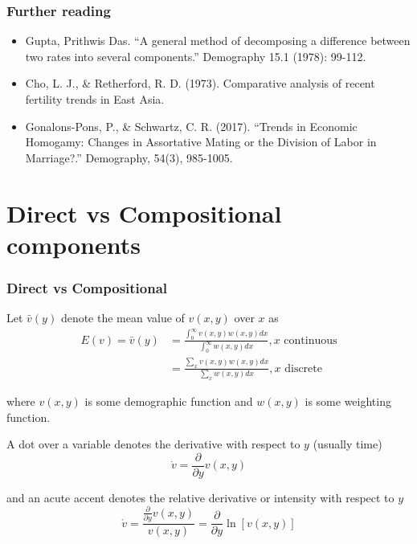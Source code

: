 \documentclass[xcolor={dvipsnames}]{beamer}
\begin{document}
\begin{frame}\frametitle{Further reading}
\begin{itemize}
\item Gupta, Prithwis Das. ``A general method of decomposing a difference between two rates into several components.'' Demography 15.1 (1978): 99-112.
\item Cho, L. J., \& Retherford, R. D. (1973). Comparative analysis of recent fertility trends in East Asia.
\item Gonalons-Pons, P., \& Schwartz, C. R. (2017). ``Trends in Economic Homogamy: Changes in Assortative Mating or the Division of Labor in Marriage?.'' Demography, 54(3), 985-1005.
\end{itemize}

\end{frame}

\section{Direct vs Compositional components}


\begin{frame}\frametitle{Direct vs Compositional}

\Large{Let $\bar{v}(y)$ denote the mean value of $v(x,y)$ over $x$ as
\hphantom{}
\begin{equation}
\begin{split}
E(v)=\bar{v}(y) & = \frac{\int_0^\infty v(x,y)w(x,y)dx}{\int_0^\infty w(x,y)dx}, \text{$x$ continuous} \\
		   & = \frac{\sum_x v(x,y)w(x,y)dx}{\sum_x w(x,y)dx} , \text{$x$ discrete}
\end{split}
\end{equation}
\hphantom{}

where $v(x,y)$ is some demographic function and $w(x,y)$ is some weighting function.

}
\end{frame}


\begin{frame}

\Large{A dot over a variable denotes the derivative with respect to $y$ (usually time)
\hphantom{}
\begin{equation*}
\dot{v}= \frac{\partial}{\partial y}v(x,y)
\end{equation*}
\hphantom{}

and an acute accent denotes the relative derivative or intensity with respect to $y$
\begin{equation*}
\acute{v}= \frac{\frac{\partial}{\partial y}v(x,y)}{v(x,y)} = \frac{\partial}{\partial y}\ln [v(x,y)]
\end{equation*}
\hphantom{}
}
\end{frame}
\end{document}
